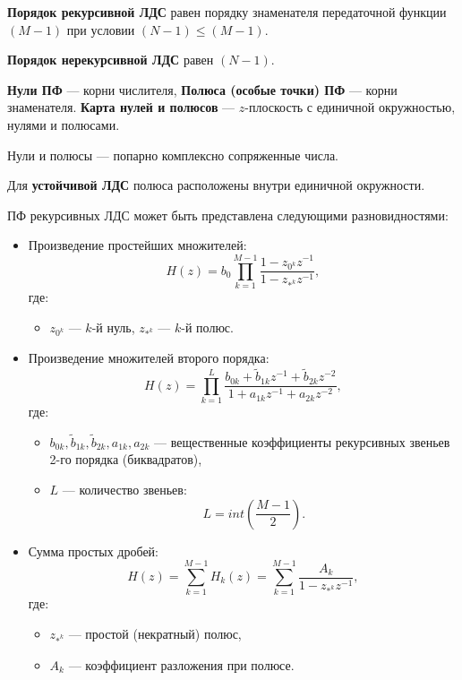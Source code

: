 \documentclass[a4paper, 14pt]{extarticle}
\begin{document}
\textbf{Порядок рекурсивной ЛДС} равен порядку знаменателя передаточной функции $(M-1)$ при условии $(N-1) \le (M-1)$.

\textbf{Порядок нерекурсивной ЛДС} равен $(N-1)$.

\textbf{Нули ПФ} --- корни числителя, \textbf{Полюса (особые точки) ПФ} --- корни знаменателя. \textbf{Карта нулей и полюсов} --- $z$-плоскость с единичной окружностью, нулями и полюсами.

Нули и полюсы --- попарно комплексно сопряженные числа.

Для \textbf{устойчивой ЛДС} полюса расположены внутри единичной окружности.

ПФ рекурсивных ЛДС может быть представлена следующими разновидностями:
\begin{itemize}
    \item Произведение простейших множителей:
        \begin{equation}
            H(z) = b_0 \prod^{M-1}_{k=1} \frac{1 - z_{0^k}z^{-1}}{1-z_{*^k}z^{-1}},
        \end{equation}
        где:
        \begin{itemize}
            \item $z_{0^k}$ --- $k$-й нуль, $z_{*^k}$ --- $k$-й полюс.
        \end{itemize}
    \item Произведение множителей второго порядка:
        \begin{equation}
            H(z) = \prod^{L}_{k=1} \frac{b_{0k} + \tilde{b}_{1k} z^{-1} + \tilde{b}_{2k}z^{-2}}{1 + a_{1k} z^{-1} + a_{2k} z^{-2}},
        \end{equation}
        где:
        \begin{itemize}
            \item $b_{0k}, \tilde{b}_{1k}, \tilde{b}_{2k}, a_{1k}, a_{2k}$ --- вещественные коэффициенты рекурсивных звеньев 2-го порядка (биквадратов),
            \item $L$ --- количество звеньев:
                \begin{equation}
                L = int( \frac{M-1}{2} ).
                \end{equation}
        \end{itemize}
    \item Сумма простых дробей:
        \begin{equation}
            H(z) = \sum^{M-1}_{k=1} H_k(z) = \sum^{M-1}_{k=1} \frac{A_k}{1-z_{*^k}z^{-1}},
        \end{equation}
        где:
        \begin{itemize}
            \item $z_{*^k}$ --- простой (некратный) полюс,
            \item $A_k$ --- коэффициент разложения при полюсе.
        \end{itemize}
\end{itemize}
\end{document}
